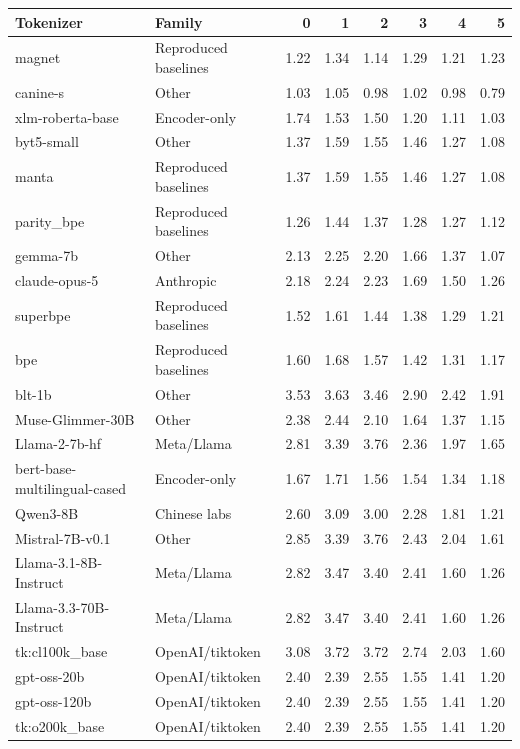 \begin{tabular}{llrrrrrr}
\toprule
Tokenizer & Family & 0 & 1 & 2 & 3 & 4 & 5 \\
\midrule
magnet & Reproduced baselines & 1.22 & 1.34 & 1.14 & 1.29 & 1.21 & 1.23 \\
canine-s & Other & 1.03 & 1.05 & 0.98 & 1.02 & 0.98 & 0.79 \\
xlm-roberta-base & Encoder-only & 1.74 & 1.53 & 1.50 & 1.20 & 1.11 & 1.03 \\
byt5-small & Other & 1.37 & 1.59 & 1.55 & 1.46 & 1.27 & 1.08 \\
manta & Reproduced baselines & 1.37 & 1.59 & 1.55 & 1.46 & 1.27 & 1.08 \\
parity\_bpe & Reproduced baselines & 1.26 & 1.44 & 1.37 & 1.28 & 1.27 & 1.12 \\
gemma-7b & Other & 2.13 & 2.25 & 2.20 & 1.66 & 1.37 & 1.07 \\
claude-opus-5 & Anthropic & 2.18 & 2.24 & 2.23 & 1.69 & 1.50 & 1.26 \\
superbpe & Reproduced baselines & 1.52 & 1.61 & 1.44 & 1.38 & 1.29 & 1.21 \\
bpe & Reproduced baselines & 1.60 & 1.68 & 1.57 & 1.42 & 1.31 & 1.17 \\
blt-1b & Other & 3.53 & 3.63 & 3.46 & 2.90 & 2.42 & 1.91 \\
Muse-Glimmer-30B & Other & 2.38 & 2.44 & 2.10 & 1.64 & 1.37 & 1.15 \\
Llama-2-7b-hf & Meta/Llama & 2.81 & 3.39 & 3.76 & 2.36 & 1.97 & 1.65 \\
bert-base-multilingual-cased & Encoder-only & 1.67 & 1.71 & 1.56 & 1.54 & 1.34 & 1.18 \\
Qwen3-8B & Chinese labs & 2.60 & 3.09 & 3.00 & 2.28 & 1.81 & 1.21 \\
Mistral-7B-v0.1 & Other & 2.85 & 3.39 & 3.76 & 2.43 & 2.04 & 1.61 \\
Llama-3.1-8B-Instruct & Meta/Llama & 2.82 & 3.47 & 3.40 & 2.41 & 1.60 & 1.26 \\
Llama-3.3-70B-Instruct & Meta/Llama & 2.82 & 3.47 & 3.40 & 2.41 & 1.60 & 1.26 \\
tk:cl100k\_base & OpenAI/tiktoken & 3.08 & 3.72 & 3.72 & 2.74 & 2.03 & 1.60 \\
gpt-oss-20b & OpenAI/tiktoken & 2.40 & 2.39 & 2.55 & 1.55 & 1.41 & 1.20 \\
gpt-oss-120b & OpenAI/tiktoken & 2.40 & 2.39 & 2.55 & 1.55 & 1.41 & 1.20 \\
tk:o200k\_base & OpenAI/tiktoken & 2.40 & 2.39 & 2.55 & 1.55 & 1.41 & 1.20 \\

\end{tabular}
